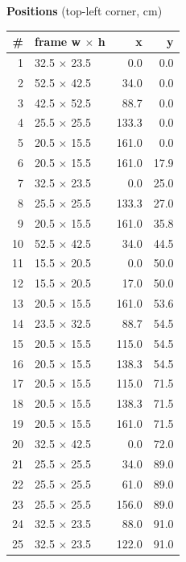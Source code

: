 \documentclass[a4paper,landscape,10pt]{article}
\begin{document}
\begin{minipage}[t]{0.25\textwidth}
\vspace{8pt}
{\bfseries Positions} (top-left corner, cm)\\[2pt]
\tiny
\begin{tabular}{@{}r l r r@{}}
\toprule
\# & frame w $\times$ h & x & y \\
\midrule
1 & 32.5 $\times$ 23.5 & 0.0 & 0.0 \\
2 & 52.5 $\times$ 42.5 & 34.0 & 0.0 \\
3 & 42.5 $\times$ 52.5 & 88.7 & 0.0 \\
4 & 25.5 $\times$ 25.5 & 133.3 & 0.0 \\
5 & 20.5 $\times$ 15.5 & 161.0 & 0.0 \\
6 & 20.5 $\times$ 15.5 & 161.0 & 17.9 \\
7 & 32.5 $\times$ 23.5 & 0.0 & 25.0 \\
8 & 25.5 $\times$ 25.5 & 133.3 & 27.0 \\
9 & 20.5 $\times$ 15.5 & 161.0 & 35.8 \\
10 & 52.5 $\times$ 42.5 & 34.0 & 44.5 \\
11 & 15.5 $\times$ 20.5 & 0.0 & 50.0 \\
12 & 15.5 $\times$ 20.5 & 17.0 & 50.0 \\
13 & 20.5 $\times$ 15.5 & 161.0 & 53.6 \\
14 & 23.5 $\times$ 32.5 & 88.7 & 54.5 \\
15 & 20.5 $\times$ 15.5 & 115.0 & 54.5 \\
16 & 20.5 $\times$ 15.5 & 138.3 & 54.5 \\
17 & 20.5 $\times$ 15.5 & 115.0 & 71.5 \\
18 & 20.5 $\times$ 15.5 & 138.3 & 71.5 \\
19 & 20.5 $\times$ 15.5 & 161.0 & 71.5 \\
20 & 32.5 $\times$ 42.5 & 0.0 & 72.0 \\
21 & 25.5 $\times$ 25.5 & 34.0 & 89.0 \\
22 & 25.5 $\times$ 25.5 & 61.0 & 89.0 \\
23 & 25.5 $\times$ 25.5 & 156.0 & 89.0 \\
24 & 32.5 $\times$ 23.5 & 88.0 & 91.0 \\
25 & 32.5 $\times$ 23.5 & 122.0 & 91.0 \\
\bottomrule
\end{tabular}
\end{minipage}
\clearpage
\end{document}
